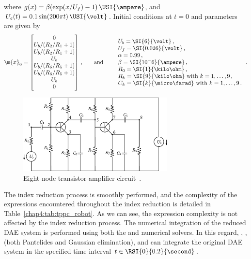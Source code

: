 %
where $g(x) = \beta(\exp(x/U_f) - 1)\,\USI{\ampere}$, and $U_e(t) = 0.1\sin(200 \pi t)\,\USI{\volt}$. Initial conditions at $t = 0$ and parameters are given by
%
\begin{equation*}
  \m{x}_0 = \begin{bmatrix}
    0 \\
    U_b/(R_2/R_1 + 1) \\
    U_b/(R_2/R_1 + 1) \\
    U_b \\
    U_b/(R_6/R_5 + 1) \\
    U_b/(R_6/R_5 + 1) \\
    U_b \\
    0 \\
  \end{bmatrix} \, \text{,}
  \qquad \text{and} \qquad
  \begin{array}{l}
    U_b = \SI{6}{\volt} \, \text{,} \\
    U_f = \SI{0.026}{\volt} \, \text{,} \\
    \alpha = 0.99 \, \text{,} \\
    \beta = \SI{10^-6}{\ampere} \, \text{,} \\
    R_0 = \SI{1}{\kilo\ohm} \, \text{,} \\
    R_k = \SI{9}{\kilo\ohm} ~ \text{with} ~ k=1, \dots, 9 \, \text{,} \\
    C_k = \SI{k}{\micro\farad} ~ \text{with} ~ k=1, \dots, 9 \, \text{.} \\
  \end{array} \, \text{.}
\end{equation*}

\begin{figure}
  \centering
  \includegraphics[width=0.7\textwidth]{figures/chapter_4/transistor_amplifier.eps}
  \caption{Eight-node transistor-amplifier circuit~\cite{lioen1998test, mazzia2008test}.}
  \label{chap4:fig:transistor_amplifier}
\end{figure}

The index reduction process is smoothly performed, and the complexity of the expressions encountered throughout the index reduction is detailed in Table~\ref{chap4:tab:tppc_robot}. As we can see, the expression complexity is not affected by the index reduction process. The numerical integration of the reduced \ac{DAE} system is performed using both the \Maple{} and \Indigo{} numerical solvers. In this regard, \Maple{}, \Mathematica{}, \Matlab{} (both Pantelides and Gaussian elimination), and \Indigo{} can integrate the original \ac{DAE} system in the specified time interval $t \in \RSI{0}{0.2}{\second}$.

